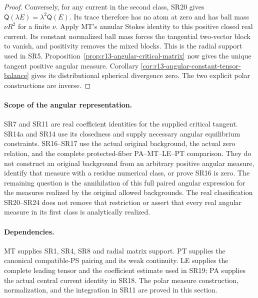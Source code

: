 \begin{proof}
Conversely, for any current in the second class, SR20 gives
$\mathsf Q(\lambda E)=\lambda^2\mathsf Q(E)$.
Its trace therefore has no atom at zero and has ball mass
$\nu R^2$ for a finite $\nu$.  Apply MT's annular
Stokes identity to this positive closed real current.
Its constant normalized ball mass forces the tangential
two-vector block to vanish, and positivity removes the
mixed blocks.  This is the radial support used in SR5.
Proposition~\ref{prop:r13-angular-critical-matrix} now gives
the unique tangent positive angular measure.  Corollary
\ref{cor:r13-angular-constant-tensor-balance} gives its
distributional spherical divergence zero.  The two explicit
polar constructions are inverse.
\end{proof}

\paragraph{Scope of the angular representation.}
SR7 and SR11 are real coefficient identities for the supplied
critical tangent.  SR14a and SR14 use its closedness and supply
necessary angular equilibrium constraints.  SR16--SR17
use the actual original background, the actual zero relation,
and the complete protected-fiber PA--MT--LE--PT comparison.
They do not construct an original background from an arbitrary
positive angular measure, identify that measure with a residue
numerical class, or prove SR16 is zero.  The remaining question
is the annihilation of this full paired angular expression
for the measures realized by the original allowed backgrounds.
The real classification SR20--SR24 does not remove that
restriction or assert that every real angular measure in
its first class is analytically realized.

\paragraph{Dependencies.}
MT supplies SR1, SR4, SR8 and radial matrix support.  PT supplies
the canonical compatible-PS pairing and its weak continuity.
LE supplies the complete leading tensor and the coefficient
estimate used in SR19; PA supplies the actual central current
identity in SR18.  The polar measure construction, normalization,
and the integration in SR11 are proved in this section.
